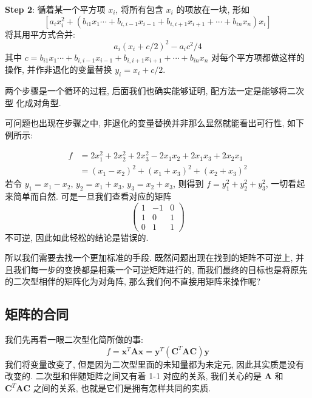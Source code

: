 \documentclass[UTF8]{book}
\begin{document}
\noindent \textbf{Step 2}: 
循着某一个平方项 $x_i$, 将所有包含 $x_i$ 的项放在一块, 
形如 $$[a_ix_i^2 + (b_{i1} x_1\cdots+b_{i,i-1} x_{i-1}+ b_{i,i+1} x_{i+1}
+ \cdots +b_{in} x_n)x_i]$$
将其用平方式合并: 
$$a_i(x_i + c/2)^2 -a_ic^2/4   $$
其中 $c = b_{i1} x_1\cdots+b_{i,i-1} x_{i-1}+ b_{i,i+1} x_{i+1}
+ \cdots +b_{in} x_n$ 
对每个平方项都做这样的操作, 
并作非退化的变量替换 $ y_i = x_i + c/2 $. 

两个步骤是一个循环的过程, 后面我们也确实能够证明, 配方法一定是能够将二次型
化成对角型. 

可问题也出现在步骤之中, 非退化的变量替换并非那么显然就能看出可行性, 
如下例所示:
\begin{example}
    \begin{equation*}
        \begin{aligned}
            f & = 2x_1^2+2x_2^2+2x_3^2-2x_1x_2+2x_1x_3+2x_2x_3\\
            &= (x_1-x_2)^2 + (x_1+x_3)^2 + (x_2+x_3)^2
        \end{aligned}       
    \end{equation*}
    若令 $y_1 = x_1 - x_2,\,y_2 = x_1+x_3,\,y_3=x_2+x_3 $, 
    则得到 $f = y_1^2 + y_2^2 + y_3^2$, 一切看起来简单而自然. 
    可是一旦我们查看对应的矩阵
    \begin{equation*}
        \begin{pmatrix}
            1&-1&0\\1&0&1\\0&1&1
        \end{pmatrix}
    \end{equation*} 
    不可逆, 因此如此轻松的结论是错误的. 
\end{example}
所以我们需要去找一个更加标准的手段. 
既然问题出现在找到的矩阵不可逆上, 并且我们每一步的变换都是相乘一个可逆矩阵进行的, 
而我们最终的目标也是将原先的二次型相伴的矩阵化为对角阵, 
那么我们何不直接用矩阵来操作呢? 


\subsection{矩阵的合同}

我们先再看一眼二次型化简所做的事: 
$$ f =\boldsymbol{x}^T \boldsymbol{A} \boldsymbol{x} =
\boldsymbol{y}^T (\boldsymbol{C}^T\boldsymbol{A} \boldsymbol{C})
\boldsymbol{y}  $$
我们将变量改变了, 但是因为二次型里面的未知量都为未定元, 
因此其实质是没有改变的. 
二次型和伴随矩阵之间又有着 1-1 对应的关系, 
我们关心的是 $\boldsymbol{A}$ 和
$ \boldsymbol{C}^T\boldsymbol{A} \boldsymbol{C} $ 之间的关系, 
也就是它们是拥有怎样共同的实质. 
\end{document}

